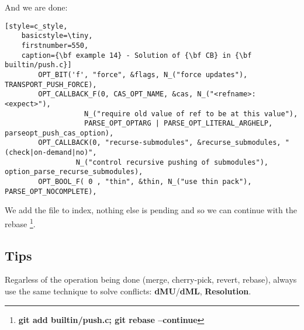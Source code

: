 And we are done:
\begin{lstlisting}[style=c_style,
	basicstyle=\tiny,
	firstnumber=550,
	caption={\bf example 14} - Solution of {\bf CB} in {\bf builtin/push.c}]
		OPT_BIT('f', "force", &flags, N_("force updates"), TRANSPORT_PUSH_FORCE),
		OPT_CALLBACK_F(0, CAS_OPT_NAME, &cas, N_("<refname>:<expect>"),
			       N_("require old value of ref to be at this value"),
			       PARSE_OPT_OPTARG | PARSE_OPT_LITERAL_ARGHELP, parseopt_push_cas_option),
		OPT_CALLBACK(0, "recurse-submodules", &recurse_submodules, "(check|on-demand|no)",
			     N_("control recursive pushing of submodules"), option_parse_recurse_submodules),
		OPT_BOOL_F( 0 , "thin", &thin, N_("use thin pack"), PARSE_OPT_NOCOMPLETE),
\end{lstlisting}

We add the file to index, nothing else is pending and so we can continue with the rebase
\footnote{{\bf git add builtin/push.c; git rebase --continue}}.

\subsection{Tips}
Regarless of the operation being done (merge, cherry-pick, revert, rebase), always use the same technique to solve
conflicts: {\bf dMU}/{\bf dML}, {\bf Resolution}.


